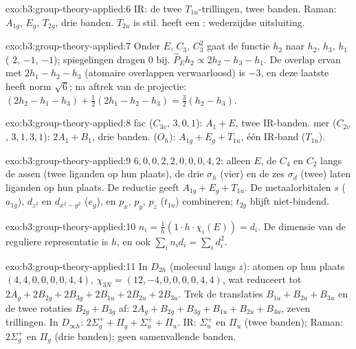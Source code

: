 \begin{solution}{exo:b3:group-theory-applied:6}
IR: de twee $T_{1u}$-trillingen, twee banden. Raman: $A_{1g}$, $E_g$, $T_{2g}$,
drie banden.
$T_{2u}$ is stil.  heeft een : wederzijdse uitsluiting.
\end{solution}

\begin{solution}{exo:b3:group-theory-applied:7}
Onder $E$, $C_3$, $C_3^2$ gaat de functie $h_2$ naar $h_2$, $h_3$, $h_1$ ( 2,
$-1$, $-1$); spiegelingen dragen 0 bij. $\hat P_Eh_2 \propto 2h_2 - h_3 - h_1$.
De overlap ervan met $2h_1 - h_2 - h_3$ (atomaire overlappen verwaarloosd)
is $-3$, en deze laatste heeft norm $\sqrt6$; na aftrek van de projectie:
$(2h_2 - h_1 - h_3) +
\frac12(2h_1 - h_2 - h_3) = \frac32(h_2 - h_3)$.
\end{solution}

\begin{solution}{exo:b3:group-theory-applied:8}
fac ($C_{3v}$,  $3, 0, 1$): $A_1 + E$, twee IR-banden. mer ($C_{2v}$,
 $3, 1, 3, 1$): $2A_1 + B_1$, drie banden.  ($O_h$): $A_{1g} + E_g
+ T_{1u}$, één IR-band ($T_{1u}$).
\end{solution}

\begin{solution}{exo:b3:group-theory-applied:9}
 $6, 0, 0, 2, 2, 0, 0, 0, 4, 2$: alleen $E$, de $C_4$ en $C_2$ langs
de assen (twee liganden op hun plaats), de drie $\sigma_h$ (vier) en de zes
$\sigma_d$ (twee) laten liganden op hun plaats. De reductie geeft $A_{1g} + E_g + T_{1u}$. De
metaalorbitalen $s$
($a_{1g}$), $d_{z^2}$ en $d_{x^2-y^2}$ ($e_g$), en $p_x$, $p_y$, $p_z$ ($t_{1u}$) combineren;
$t_{2g}$ blijft niet-bindend.
\end{solution}

\begin{solution}{exo:b3:group-theory-applied:10}
$n_i = \frac1h(1\cdot h\cdot\chi_i(E)) = d_i$. De dimensie van de reguliere
representatie is $h$, en ook $\sum_in_id_i = \sum_id_i^2$.
\end{solution}

\begin{solution}{exo:b3:group-theory-applied:11}
In $D_{2h}$ (molecuul langs $z$): atomen op hun plaats $(4, 4, 0, 0, 0, 0, 4, 4)$, $\chi_{3N}
= (12, -4, 0, 0, 0, 0, 4, 4)$, wat reduceert tot $2A_g + 2B_{2g} + 2B_{3g} + 2B_{1u} + 2B_{2u}
+ 2B_{3u}$. Trek de translaties $B_{1u} + B_{2u} + B_{3u}$ en de twee rotaties
$B_{2g} + B_{3g}$ af: $2A_g + B_{2g} + B_{3g} + B_{1u} + B_{2u} + B_{3u}$,
zeven trillingen.
In $D_{\infty h}$: $2\Sigma_g^+ + \Pi_g + \Sigma_u^+ + \Pi_u$. IR: $\Sigma_u^+$ en $\Pi_u$
(twee banden); Raman: $2\Sigma_g^+$ en $\Pi_g$ (drie banden); geen
samenvallende banden.
\end{solution}

